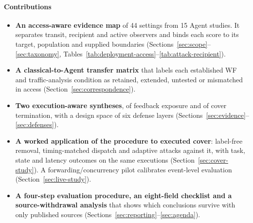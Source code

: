 \paragraph{Contributions}
\begin{itemize}
\item \textbf{An access-aware evidence map} of 44 settings from 15 Agent studies. It separates transit, recipient and active observers and binds each score to its target, population and supplied boundaries (Sections~\ref{sec:scope}--\ref{sec:taxonomy}, Tables~\ref{tab:deployment-access}--\ref{tab:attack-recipient}).
\item \textbf{A classical-to-Agent transfer matrix} that labels each established WF and traffic-analysis condition as retained, extended, untested or mismatched in access (Section~\ref{sec:correspondence}).
\item \textbf{Two execution-aware syntheses}, of feedback exposure and of cover termination, with a design space of six defense layers (Sections~\ref{sec:evidence}--\ref{sec:defenses}).
\item \textbf{A worked application of the procedure to executed cover}: label-free removal, timing-matched dispatch and adaptive attacks against it, with task, state and latency outcomes on the same executions (Section~\ref{sec:cover-study}). A forwarding/concurrency pilot calibrates event-level evaluation (Section~\ref{sec:live-study}).
\item \textbf{A four-step evaluation procedure, an eight-field checklist and a source-withdrawal analysis} that shows which conclusions survive with only published sources (Sections~\ref{sec:reporting}--\ref{sec:agenda}).
\end{itemize}
